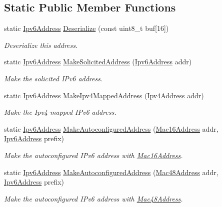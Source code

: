 \subsection*{Static Public Member Functions}
\begin{DoxyCompactItemize}
\item 
static \hyperlink{classns3_1_1Ipv6Address}{Ipv6\+Address} \hyperlink{classns3_1_1Ipv6Address_a5c6a183643ab8f7371bd490ac22c4ffc}{Deserialize} (const uint8\+\_\+t buf\mbox{[}16\mbox{]})
\begin{DoxyCompactList}\small\item\em Deserialize this address. \end{DoxyCompactList}\item 
static \hyperlink{classns3_1_1Ipv6Address}{Ipv6\+Address} \hyperlink{classns3_1_1Ipv6Address_a1f6831d89cb902b8af5c73baaab97832}{Make\+Solicited\+Address} (\hyperlink{classns3_1_1Ipv6Address}{Ipv6\+Address} addr)
\begin{DoxyCompactList}\small\item\em Make the solicited I\+Pv6 address. \end{DoxyCompactList}\item 
static \hyperlink{classns3_1_1Ipv6Address}{Ipv6\+Address} \hyperlink{classns3_1_1Ipv6Address_ae2db372827002d9791dec4edb6925021}{Make\+Ipv4\+Mapped\+Address} (\hyperlink{classns3_1_1Ipv4Address}{Ipv4\+Address} addr)
\begin{DoxyCompactList}\small\item\em Make the Ipv4-\/mapped I\+Pv6 address. \end{DoxyCompactList}\item 
static \hyperlink{classns3_1_1Ipv6Address}{Ipv6\+Address} \hyperlink{classns3_1_1Ipv6Address_a74e6a79f61e9edd0ebdbafb4db88dc35}{Make\+Autoconfigured\+Address} (\hyperlink{classns3_1_1Mac16Address}{Mac16\+Address} addr, \hyperlink{classns3_1_1Ipv6Address}{Ipv6\+Address} prefix)
\begin{DoxyCompactList}\small\item\em Make the autoconfigured I\+Pv6 address with \hyperlink{classns3_1_1Mac16Address}{Mac16\+Address}. \end{DoxyCompactList}\item 
static \hyperlink{classns3_1_1Ipv6Address}{Ipv6\+Address} \hyperlink{classns3_1_1Ipv6Address_a571dabd1e8b2a1542caf055d6c78827d}{Make\+Autoconfigured\+Address} (\hyperlink{classns3_1_1Mac48Address}{Mac48\+Address} addr, \hyperlink{classns3_1_1Ipv6Address}{Ipv6\+Address} prefix)
\begin{DoxyCompactList}\small\item\em Make the autoconfigured I\+Pv6 address with \hyperlink{classns3_1_1Mac48Address}{Mac48\+Address}. \end{DoxyCompactList}\item 

\end{DoxyCompactItemize}
